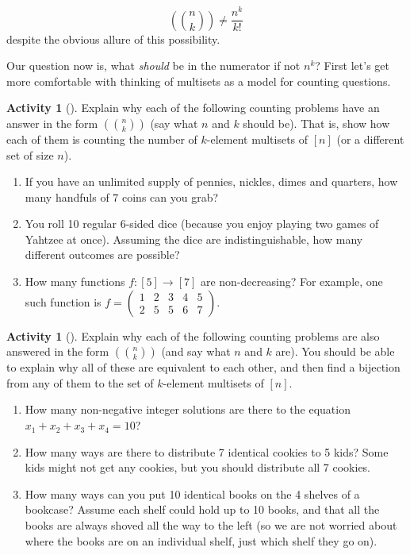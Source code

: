 \documentclass[10pt,]{book}
\theoremstyle{plain}
\theoremstyle{definition}
\theoremstyle{definition}
\theoremstyle{definition}
\newtheorem{activity}[project]{Activity}
\numberwithin{equation}{chapter}
\newcommand{\mchoose}[2]{\left(\!\binom{#1}{#2}\!\right)}
\newcommand{\twoline}[2]{\begin{pmatrix}#1 \\ #2 \end{pmatrix}}
\newcommand{\amp}{&}
\begin{document}
\begin{equation*}
\mchoose{n}{k} \ne \frac{n^k}{k!}
\end{equation*}
despite the obvious allure of this possibility.%
\par
\hypertarget{p-809}{}%
Our question now is, what \emph{should} be in the numerator if not \(n^k\)?  First let's get more comfortable with thinking of multisets as a model for counting questions.%
\begin{activity}[]\label{activity-113}
\hypertarget{p-810}{}%
Explain why each of the following counting problems have an answer in the form \(\mchoose{n}{k}\) (say what \(n\) and \(k\) should be).  That is, show how each of them is counting the number of \(k\)-element multisets of \([n]\) (or a different set of size \(n\)).%
\begin{enumerate}[font=\bfseries,label=(\alph*),ref=\alph*]
\item\label{task-153} \hypertarget{p-811}{}%
If you have an unlimited supply of pennies, nickles, dimes and quarters, how many handfuls of 7 coins can you grab?%
\item\label{task-154} \hypertarget{p-812}{}%
You roll 10 regular 6-sided dice (because you enjoy playing two games of Yahtzee at once).  Assuming the dice are indistinguishable, how many different outcomes are possible?%
\item\label{task-155} \hypertarget{p-813}{}%
How many functions \(f:[5] \to [7]\) are non-decreasing?  For example, one such function is \(f = \twoline{1 \amp 2 \amp 3 \amp 4 \amp 5}{2 \amp 5 \amp 5 \amp 6 \amp 7}\).%
\end{enumerate}
\end{activity}
\begin{activity}[]\label{act-distributionintro}
\hypertarget{p-814}{}%
Explain why each of the following counting problems are also answered in the form \(\mchoose{n}{k}\) (and say what \(n\) and \(k\) are).  You should be able to explain why all of these are equivalent to each other, and then find a bijection from any of them to the set of \(k\)-element multisets of \([n]\).%
\begin{enumerate}[font=\bfseries,label=(\alph*),ref=\alph*]
\item\label{task-156} \hypertarget{p-815}{}%
How many non-negative integer solutions are there to the equation \(x_1 + x_2 + x_3 + x_4 = 10\)?%
\item\label{task-157} \hypertarget{p-816}{}%
How many ways are there to distribute 7 identical cookies to 5 kids? Some kids might not get any cookies, but you should distribute all 7 cookies.%
\item\label{task-158} \hypertarget{p-817}{}%
How many ways can you put 10 identical books on the 4 shelves of a bookcase?  Assume each shelf could hold up to 10 books, and that all the books are always shoved all the way to the left (so we are not worried about where the books are on an individual shelf, just which shelf they go on).%
\end{enumerate}
\end{activity}
\end{document}
